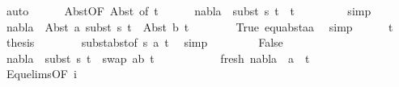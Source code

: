 \begin{isabellebody}
\ auto\isanewline
\ \ \ \ \isamarkupfalse%
\ Abst{\isacharparenleft}{\kern0pt}{}{\isacharparenright}{\kern0pt}{\isacharbrackleft}{\kern0pt}OF\ Abst{\isacharparenleft}{\kern0pt}{}{\isacharparenright}{\kern0pt}{\isacharcomma}{\kern0pt}\ of\ t{}{\isacharprime}{\kern0pt}{\isacharbrackright}{\kern0pt}\isanewline
\ \ \ \ \isamarkupfalse%
\ {\isachardoublequoteopen}nabla\ {\isasymturnstile}\ subst\ s{}\ t{}{\isacharprime}{\kern0pt}\ {\isasymapprox}\ t{}{\isacharprime}{\kern0pt}{\isachardoublequoteclose}\ \isanewline
\ \ \ \ \ \ \isamarkupfalse%
\ simp\isanewline
\ \ \ \ \isamarkupfalse%
\ {\isachardoublequoteopen}nabla\ {\isasymturnstile}\ Abst\ a\ {\isacharparenleft}{\kern0pt}subst\ s{}\ t{}{\isacharprime}{\kern0pt}{\isacharparenright}{\kern0pt}\ {\isasymapprox}\ Abst\ b\ t{}{\isacharprime}{\kern0pt}{\isachardoublequoteclose}\isanewline
\ \ \ \ \ \ \isamarkupfalse%
\ True\ equ{\isacharunderscore}{\kern0pt}abst{\isacharunderscore}{\kern0pt}aa\ \isamarkupfalse%
\ simp\isanewline
\ \ \ \ \isamarkupfalse%
\ t{}\ \isamarkupfalse%
\ {\isacharquery}{\kern0pt}thesis\isanewline
\ \ \ \ \ \ \isamarkupfalse%
\ subst{\isacharunderscore}{\kern0pt}abst{\isacharbrackleft}{\kern0pt}of\ s{}\ a\ t{}{\isacharprime}{\kern0pt}{\isacharbrackright}{\kern0pt}\ \isamarkupfalse%
\ simp\isanewline
\ \ \isamarkupfalse%
\isanewline
\ \ \ \ \isamarkupfalse%
\ False\isanewline
\ \ \ \ \isamarkupfalse%
\ {\isachardoublequoteopen}nabla\ {\isasymturnstile}\ {\isacharparenleft}{\kern0pt}subst\ s{}\ t{}{\isacharprime}{\kern0pt}{\isacharparenright}{\kern0pt}\ {\isasymapprox}\ swap\ {\isacharbrackleft}{\kern0pt}{\isacharparenleft}{\kern0pt}a{\isacharcomma}{\kern0pt}b{\isacharparenright}{\kern0pt}{\isacharbrackright}{\kern0pt}\ t{}{\isacharprime}{\kern0pt}{\isachardoublequoteclose}\isanewline
\ \ \ \ \ \ \ \ \ \ \ fresh{\isacharcolon}{\kern0pt}\ {\isachardoublequoteopen}nabla\ {\isasymturnstile}\ a\ {\isasymsharp}\ t{}{\isacharprime}{\kern0pt}{\isachardoublequoteclose}\isanewline
\ \ \ \ \ \ \isamarkupfalse%
\ Equ{\isacharunderscore}{\kern0pt}elims{\isacharparenleft}{\kern0pt}{}{\isacharparenright}{\kern0pt}{\isacharbrackleft}{\kern0pt}OF\ i{\isacharbrackright}{\kern0pt}\ \isamarkupfalse%

\end{isabellebody}

